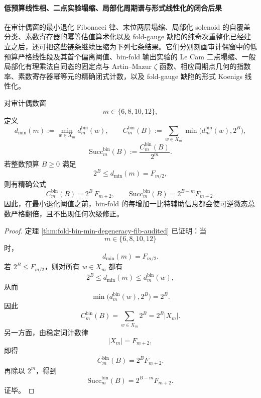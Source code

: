 \paragraph{低预算线性相、二点实验塌缩、局部化周期谱与形式线性化的闭合后果}
在审计偶窗的最小退化 Fibonacci 律、末位两层塌缩、局部化 solenoid 的自覆盖分类、素数寄存器的幂等估值算术化以及 fold-gauge 缺陷的纯奇次重整化已经建立之后，还可把这些链条继续压缩为下列七条结果。它们分别刻画审计偶窗中的低预算严格线性段及其首个偏离阈值、bin-fold 输出实验的 Le Cam 二点塌缩、一般局部化有理乘法自同态的固定点与 Artin--Mazur \(\zeta\) 函数、相应周期点几何的指数率、素数寄存器幂等元的精确闭式计数，以及 fold-gauge 缺陷的形式 Koenigs 线性化。

\begin{theorem}\label{thm:xi-time-part69-audited-even-pure-pigeonhole-linear-phase}
对审计偶数窗
\[
m\in\{6,8,10,12\},
\]
定义
\[
d_{\min}(m):=\min_{w\in X_m}d_m^{\mathrm{bin}}(w),
\qquad
C_m^{\mathrm{bin}}(B):=\sum_{w\in X_m}\min\bigl(d_m^{\mathrm{bin}}(w),2^B\bigr),
\]
\[
\mathrm{Succ}_m^{\mathrm{bin}}(B):=\frac{C_m^{\mathrm{bin}}(B)}{2^m}.
\]
若整数预算 \(B\ge 0\) 满足
\[
2^B\le d_{\min}(m)=F_{m/2},
\]
则有精确公式
\[
C_m^{\mathrm{bin}}(B)=2^B\,F_{m+2},
\qquad
\mathrm{Succ}_m^{\mathrm{bin}}(B)=2^{B-m}F_{m+2}.
\]
因此，在最小退化阈值之前，bin-fold 的每增加一比特辅助信息都会使可逆微态总数严格翻倍，且不出现任何次级修正。
\end{theorem}
\begin{proof}
定理 \ref{thm:fold-bin-min-degeneracy-fib-audited} 已证明：当
\[
m\in\{6,8,10,12\}
\]
时，
\[
d_{\min}(m)=F_{m/2}.
\]
若 \(2^B\le F_{m/2}\)，则对所有 \(w\in X_m\) 都有
\[
2^B\le d_{\min}(m)\le d_m^{\mathrm{bin}}(w),
\]
从而
\[
\min\bigl(d_m^{\mathrm{bin}}(w),2^B\bigr)=2^B.
\]
因此
\[
C_m^{\mathrm{bin}}(B)
=
\sum_{w\in X_m}2^B
=
2^B|X_m|.
\]
另一方面，由稳定词计数律
\[
|X_m|=F_{m+2},
\]
即得
\[
C_m^{\mathrm{bin}}(B)=2^BF_{m+2}.
\]
再除以 \(2^m\)，得到
\[
\mathrm{Succ}_m^{\mathrm{bin}}(B)=2^{B-m}F_{m+2}.
\]
证毕。
\end{proof}

